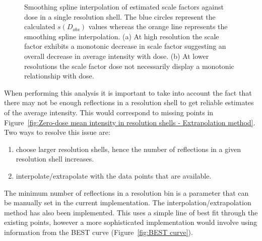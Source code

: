 \begin{figure}
\begin{subfigure}[b]{1\textwidth}
                \caption{}
                \label{fig:scale factor not monotonic - Extrapolation method}
        \end{subfigure}
        \caption[Smoothing spline interpolation of estimated scale factors against dose in a single resolution shell.]{Smoothing spline interpolation of estimated scale factors against dose in a single resolution shell.
        The blue circles represent the calculated $s(D_{obs})$ values whereas the orange line represents the smoothing spline interpolation.
        (a) At high resolution the scale factor exhibits a monotonic decrease in scale factor suggesting an overall decrease in average intensity with dose.
        (b) At lower resolutions the scale factor dose not necessarily display a monotonic relationship with dose.}
        \label{fig:Scale factors, smoothing interpolation - Extrapolation method}
\end{figure}

When performing this analysis it is important to take into account the fact that there may not be enough reflections in a resolution shell to get reliable estimates of the average intensity.
This would correspond to missing points in Figure~\ref{fig:Zero-dose mean intensity in resolution shells - Extrapolation method}.
Two ways to resolve this issue are:
\begin{enumerate}
    \item choose larger resolution shells, hence the number of reflections in a given resolution shell increases.
    \item interpolate/extrapolate with the data points that are available.
\end{enumerate}
The minimum number of reflections in a resolution bin is a parameter that can be manually set in the current implementation. The interpolation/extrapolation method has also been implemented.
This uses a simple line of best fit through the existing points, however a more sophisticated implementation would involve using information from the BEST curve (Figure~\ref{fig:BEST curve}).


